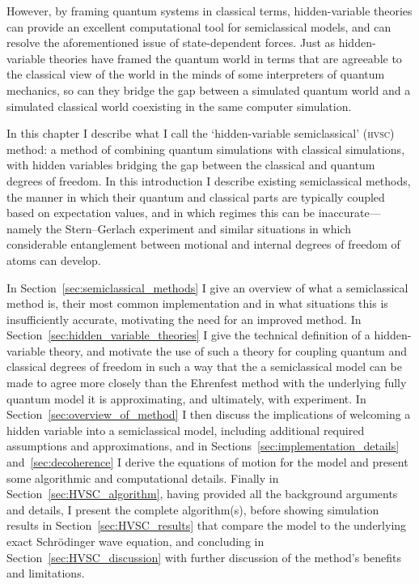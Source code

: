 However, by framing quantum systems in classical terms, hidden-variable theories can provide an excellent computational tool for semiclassical models, and can resolve the aforementioned issue of state-dependent forces. Just as hidden-variable theories have framed the quantum world in terms that are agreeable to the classical view of the world in the minds of some interpreters of quantum mechanics, so can they bridge the gap between a simulated quantum world and a simulated classical world coexisting in the same computer simulation.

In this chapter I describe what I call the `hidden-variable semiclassical' (\textsc{hvsc}) method: a method of combining quantum simulations with classical simulations, with hidden variables bridging the gap between the classical and quantum degrees of freedom. In this introduction I describe existing semiclassical methods, the manner in which their quantum and classical parts are typically coupled based on expectation values, and in which regimes this can be inaccurate---namely the Stern--Gerlach experiment and similar situations in which considerable entanglement between motional and internal degrees of freedom of atoms can develop.

In Section~\ref{sec:semiclassical_methods} I give an overview of what a semiclassical method is, their most common implementation and in what situations this is insufficiently accurate, motivating the need for an improved method. In Section~\ref{sec:hidden_variable_theories} I give the technical definition of a hidden-variable theory, and motivate the use of such a theory for coupling quantum and classical degrees of freedom in such a way that the a semiclassical model can be made to agree more closely than the Ehrenfest method with the underlying fully quantum model it is approximating, and ultimately, with experiment. In Section~\ref{sec:overview_of_method} I then discuss the implications of welcoming a hidden variable into a semiclassical model, including additional required assumptions and approximations, and in Sections~\ref{sec:implementation_details} and~\ref{sec:decoherence} I derive the equations of motion for the model and present some algorithmic and computational details. Finally in Section~\ref{sec:HVSC_algorithm}, having provided all the background arguments and details, I present the complete algorithm(s), before showing simulation results in Section~\ref{sec:HVSC_results} that compare the model to the underlying exact Schr\"odinger wave equation, and concluding in Section~\ref{sec:HVSC_discussion} with further discussion of the method's benefits and limitations.

